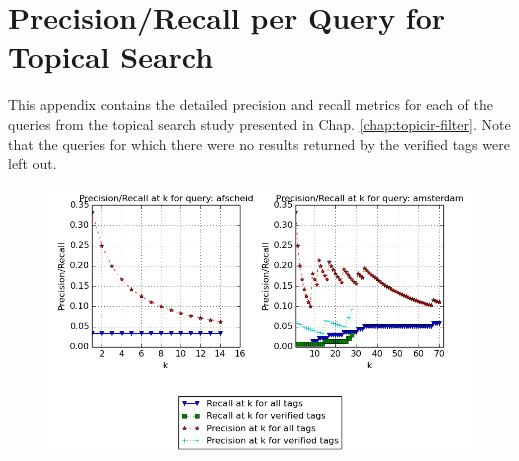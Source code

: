 \chapter{Precision/Recall per Query for Topical Search}\label{appen:prec-recall-topical}
This appendix contains the detailed precision and recall metrics for each of the queries from the topical search study presented in Chap. \ref{chap:topicir-filter}. Note that the queries for which there were no results returned by the verified tags were left out.

\begin{figure}[H]
\centering
\includegraphics[scale=.55]{appendixd/queries-afscheid}
\end{figure}


